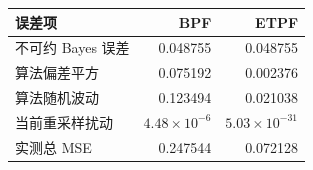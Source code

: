 \begin{tabular}{lrr}
\toprule
误差项 & BPF & ETPF \\
\midrule
不可约 Bayes 误差 & 0.048755 & 0.048755 \\
算法偏差平方 & 0.075192 & 0.002376 \\
算法随机波动 & 0.123494 & 0.021038 \\
当前重采样扰动 & $4.48\times10^{-6}$ & $5.03\times10^{-31}$ \\
\midrule
实测总 MSE & 0.247544 & 0.072128 \\
\bottomrule
\end{tabular}
